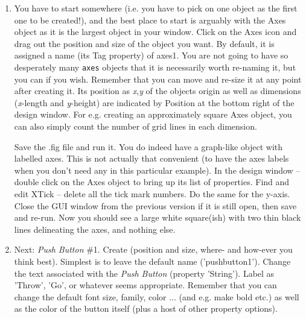 \documentclass{tufte-book} %
\begin{document}
\begin{enumerate}
\setlength{\itemindent}{.2in}

\item You have to start somewhere (i.e. you have to pick on one object as the first one to be created!), and the best place to start is arguably with the \textsf{Axes} object as it is the largest object in your window. Click on the \textsf{Axes} icon and drag out the position and size of the object you want. By default, it is assigned a name (its \textsf{Tag} property) of \textsf{axes1}. You are not going to have so desperately many \texttt{axes} objects that it is necessarily worth re-naming it, but you can if you wish. Remember that you can move and re-size it at any point after creating it. Its position as \textit{x},\textit{y} of the objects origin as well as dimensions (\textit{x}-length and \textit{y}-height) are indicated by \textsf{Position} at the bottom right of the design window. For e.g. creating an approximately square \textsf{Axes} object, you can also simply count the number of grid lines in each dimension.

Save the \textsf{.fig} file and run it. You do indeed have a graph-like object with labelled axes. This is not actually that convenient (to have the axes labels when you don't need any in this particular example). In the design window -- double
click on the \textsf{Axes} object to bring up its list of properties. Find and edit \textsf{XTick} -- delete all the tick mark numbers. Do the same for the y-axis. Close the GUI window from the previous version if it is still open, then save and re-run. Now you should see a large white square(ish) with two thin black lines delineating the axes, and nothing else.

\item Next: \textit{Push Button} \#1. Create (position and size, where- and how-ever you think best). Simplest is to leave the default name ('\textsf{pushbutton}1'). Change the text associated with the \textit{Push Button} (property '\textsf{String}'). Label as 'Throw', 'Go', or whatever seems appropriate. Remember that you can change the default font size, family, color ... (and e.g. make bold etc.) as well as the color of the button itself (plus a host of other property options).


\end{enumerate}
\end{document}
